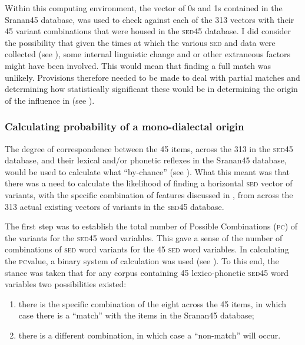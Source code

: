 {{{Within this computing environment, the  vector of 0s and 1s contained in the Sranan45 database, was used to check against each of the 313 vectors with their 45 variant combinations that were housed in the \textsc{sed45} database. I did consider the possibility that given the times at which the various \textsc{sed} and  data were collected (see ), some internal linguistic change and or other extraneous factors might have been involved. This would mean that finding a full match was unlikely. Provisions therefore needed to be made to deal with partial matches and determining how statistically significant these would be in determining the origin of the  influence in  (see ).

\subsubsection{Calculating probability of a mono-dialectal origin} \label{3.4.3.1}
The degree of correspondence between the 45 items, across the 313  in the \textsc{sed45} database, and their lexical and/or phonetic reflexes in the Sranan45 database, would be used to calculate what ``by-chance''  (see ). What this meant was that there was a need to calculate the likelihood of finding a horizontal \textsc{sed} vector of  variants, with the specific combination of features discussed in , from across the 313 actual existing vectors of variants in the \textsc{sed45} database.

The first step was to establish the total number of Possible Combinations (\textsc{pc}) of the variants for the \textsc{sed45} word variables. This gave a sense of the number of combinations of \textsc{sed} word variants for the 45 \textsc{sed} word variables. In calculating the \textsc{pc}value, a binary system of calculation was used (see ). To this end, the stance was taken that for any corpus containing 45 lexico-phonetic \textsc{sed45} word variables two possibilities existed:

\begin{enumerate}
  \item {there is the specific combination of the eight  across the 45 items, in which case there is a ``match'' with the items in the Sranan45 database;}
  \item {there is a different combination, in which case a ``non-match'' will occur.}
\end{enumerate}

}}}
